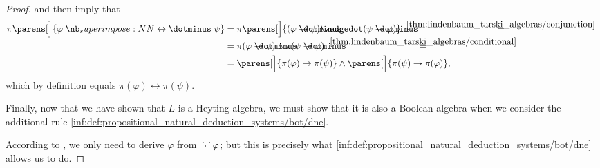 \begin{proof}
   and  then imply that
  \begin{align*}
    \pi\parens[\Big]{ \varphi \syniff \psi }
    &=
    \pi\parens[\Big]{ (\varphi \synimplies \psi) \synwedge (\psi \synimplies \varphi) }
    \reloset {\ref{thm:lindenbaum_tarski_algebras/conjunction}} = \\ &=
    \pi(\varphi \synimplies \psi) \wedge \pi(\psi \synimplies \varphi)
    \reloset {\ref{thm:lindenbaum_tarski_algebras/conditional}} = \\ &=
    \parens[\Big]{ \pi(\varphi) \rightarrow \pi(\psi) } \wedge \parens[\Big]{ \pi(\psi) \rightarrow \pi(\varphi) },
  \end{align*}
  which by definition equals \( \pi(\varphi) \leftrightarrow \pi(\psi) \).

   Finally, now that we have shown that \( L \) is a Heyting algebra, we must show that it is also a Boolean algebra when we consider the additional rule \ref{inf:def:propositional_natural_deduction_systems/bot/dne}.

  According to , we only need to derive \( \varphi \) from \( \dot{\neg} \dot{\neg} \varphi \); but this is precisely what \ref{inf:def:propositional_natural_deduction_systems/bot/dne} allows us to do.
\end{proof}

